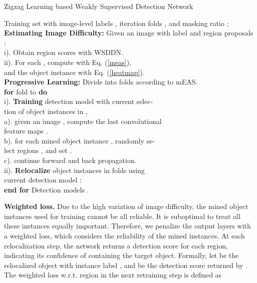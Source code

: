 \documentclass[10pt,twocolumn,letterpaper]{article}
\begin{document}
\begin{algorithm}[t]
\caption{Zigzag Learning based Weakly Supervised Detection Network}\label{algorithm1}
\begin{algorithmic}
\REQUIRE  Training set  with image-level labels , iteration folds , and masking ratio ; \\
\textbf{Estimating Image Difficulty:} Given an image  with label  and region proposals :\\
\quad i). Obtain region scores  with WSDDN.\\
\quad ii). For each , compute  with Eq. (\ref{meas}), \\
\quad and the object instance  with Eq. (\ref{heatmap}).\\
\textbf{Progressive Learning:} Divide  into  folds  according to mEAS.\\
\textbf{for} fold  to  \textbf{do}\\
\quad i). \textbf{Training} detection model  with current selec-\\
\quad tion of object instances in , \\
 \quad \quad a). given an image , compute the last convolutional \\
  \quad \quad feature maps . \\
 \quad \quad b). for each mined object instance , randomly se-\\
  \quad \quad lect regions , and set . \\
\quad  \quad c). continue forward and back propagation. \\
\quad ii). \textbf{Relocalize} object instances in folds  using \\
 \quad current detection model :\\
 \textbf{end for}
\ENSURE Detection models .
\end{algorithmic}
\end{algorithm}

\textbf{Weighted loss.} Due to the high variation of image difficulty, the mined object instances used for training cannot be all reliable. It is suboptimal to treat all these instances equally important. Therefore, we penalize the output layers with a weighted loss, which considers the reliability of the mined instances. At each relocalization step, the network  returns a detection score for each region, indicating its confidence of containing the target object. Formally, let  be the relocalized object with instance label , and  be the detection score returned by . The weighted loss w.r.t. region  in the next retraining step is defined as
\end{document}
